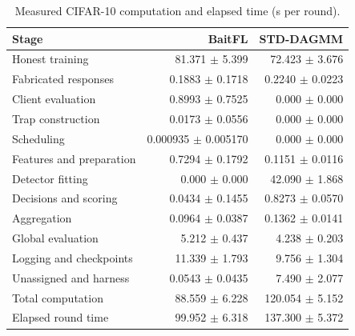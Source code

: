 \begin{table}[t]\centering\footnotesize\setlength{\tabcolsep}{8pt}
\caption{Measured CIFAR-10 computation and elapsed time (s per round).}\label{tab:std-segments-cifar10}
\begin{tabular}{lrr}\toprule Stage & BaitFL & STD-DAGMM \\ \midrule
Honest training & 81.371 $\pm$ 5.399 & 72.423 $\pm$ 3.676 \\
Fabricated responses & 0.1883 $\pm$ 0.1718 & 0.2240 $\pm$ 0.0223 \\
Client evaluation & 0.8993 $\pm$ 0.7525 & 0.000 $\pm$ 0.000 \\
Trap construction & 0.0173 $\pm$ 0.0556 & 0.000 $\pm$ 0.000 \\
Scheduling & 0.000935 $\pm$ 0.005170 & 0.000 $\pm$ 0.000 \\
Features and preparation & 0.7294 $\pm$ 0.1792 & 0.1151 $\pm$ 0.0116 \\
Detector fitting & 0.000 $\pm$ 0.000 & 42.090 $\pm$ 1.868 \\
Decisions and scoring & 0.0434 $\pm$ 0.1455 & 0.8273 $\pm$ 0.0570 \\
Aggregation & 0.0964 $\pm$ 0.0387 & 0.1362 $\pm$ 0.0141 \\
Global evaluation & 5.212 $\pm$ 0.437 & 4.238 $\pm$ 0.203 \\
\midrule
Logging and checkpoints & 11.339 $\pm$ 1.793 & 9.756 $\pm$ 1.304 \\
Unassigned and harness & 0.0543 $\pm$ 0.0435 & 7.490 $\pm$ 2.077 \\
\midrule
Total computation & 88.559 $\pm$ 6.228 & 120.054 $\pm$ 5.152 \\
Elapsed round time & 99.952 $\pm$ 6.318 & 137.300 $\pm$ 5.372 \\
\bottomrule\end{tabular}\end{table}
